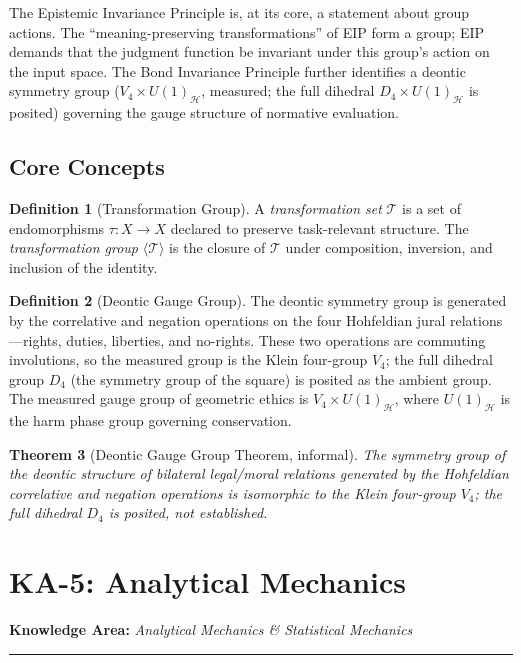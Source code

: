 \documentclass[12pt,letterpaper]{article}
\newtheorem{theorem}{Theorem}[section]
\theoremstyle{definition}
\newtheorem{definition}[theorem]{Definition}
\theoremstyle{plain}
\newcommand{\calT}{\mathcal{T}}
\newcommand{\calH}{\mathcal{H}}
\newcommand{\genT}{\langle \mathcal{T} \rangle}
\newcommand{\ka}[1]{\vspace{1em}\noindent\textbf{\large Knowledge Area:} \textit{#1}\vspace{0.5em}\hrule\vspace{0.5em}}
\begin{document}
The Epistemic Invariance Principle is, at its core, a statement about group actions. The ``meaning-preserving transformations'' of EIP form a group; EIP demands that the judgment function be invariant under this group's action on the input space. The Bond Invariance Principle further identifies a deontic symmetry group ($V_4 \times U(1)_\calH$, measured; the full dihedral $D_4 \times U(1)_\calH$ is posited) governing the gauge structure of normative evaluation.

\subsection{Core Concepts}

\begin{definition}[Transformation Group]
A \emph{transformation set} $\calT$ is a set of endomorphisms $\tau: X \to X$ declared to preserve task-relevant structure. The \emph{transformation group} $\genT$ is the closure of $\calT$ under composition, inversion, and inclusion of the identity.
\end{definition}

\begin{definition}[Deontic Gauge Group]
The deontic symmetry group is generated by the correlative and negation operations on the four Hohfeldian jural relations---rights, duties, liberties, and no-rights. These two operations are commuting involutions, so the measured group is the Klein four-group $V_4$; the full dihedral group $D_4$ (the symmetry group of the square) is posited as the ambient group. The measured gauge group of geometric ethics is $V_4 \times U(1)_\calH$, where $U(1)_\calH$ is the harm phase group governing conservation.
\end{definition}

\begin{theorem}[Deontic Gauge Group Theorem, informal]
The symmetry group of the deontic structure of bilateral legal/moral relations generated by the Hohfeldian correlative and negation operations is isomorphic to the Klein four-group $V_4$; the full dihedral $D_4$ is posited, not established.
\end{theorem}


\section{KA-5: Analytical Mechanics}
\label{sec:ka5}

\ka{Analytical Mechanics \& Statistical Mechanics}
\end{document}
